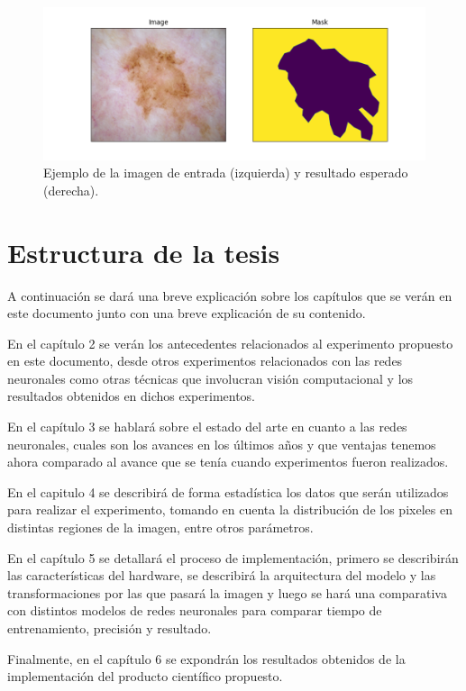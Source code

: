\begin{figure}
    \includegraphics[width=150mm]{Figuras/plot_masks.png}
    \centering
    \caption{Ejemplo de la imagen de entrada (izquierda) y resultado esperado (derecha).}
\end{figure}

\section{Estructura de la tesis}

A continuación se dará una breve explicación sobre los capítulos que se verán en este documento junto con una breve explicación de su contenido.

En el capítulo 2 se verán los antecedentes relacionados al experimento propuesto en este documento, desde otros experimentos relacionados con las redes neuronales como otras técnicas que involucran visión computacional y los resultados obtenidos en dichos experimentos.

En el capítulo 3 se hablará sobre el estado del arte en cuanto a las redes neuronales, cuales son los avances en los últimos años y que ventajas tenemos ahora comparado al avance que se tenía cuando experimentos fueron realizados.

En el capitulo 4 se describirá de forma estadística los datos que serán utilizados para realizar el experimento, tomando en cuenta la distribución de los pixeles en distintas regiones de la imagen, entre otros parámetros. 

En el capítulo 5 se detallará el proceso de implementación, primero se describirán las características del hardware, se describirá la arquitectura del modelo y las transformaciones por las que pasará la imagen y luego se hará una comparativa con distintos modelos de redes neuronales para comparar tiempo de entrenamiento, precisión y resultado.

Finalmente, en el capítulo 6 se expondrán los resultados obtenidos de la implementación del producto científico propuesto.

